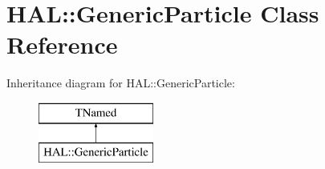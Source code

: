 \hypertarget{class_h_a_l_1_1_generic_particle}{\section{H\+A\+L\+:\+:Generic\+Particle Class Reference}
\label{class_h_a_l_1_1_generic_particle}
}
Inheritance diagram for H\+A\+L\+:\+:Generic\+Particle\+:\begin{figure}[H]
\begin{center}
\leavevmode
\includegraphics[height=2.000000cm]{class_h_a_l_1_1_generic_particle}
\end{center}
\end{figure}
